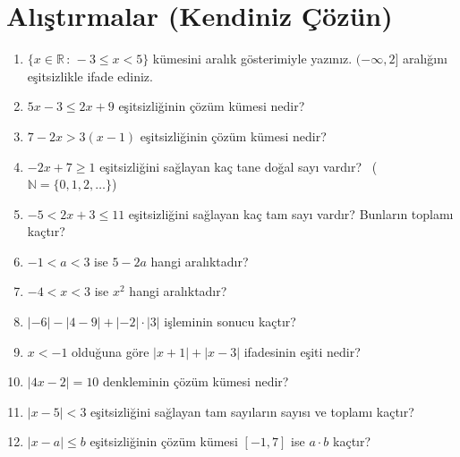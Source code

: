 \kendinizoncesi
\section{Alıştırmalar (Kendiniz Çözün)}

\begin{enumerate}[label=\textbf{\arabic*.},leftmargin=*,itemsep=4pt]
\item \(\{x\in\mathbb{R}\,:\,-3\le x<5\}\) kümesini aralık gösterimiyle yazınız. \((-\infty,2]\) aralığını eşitsizlikle ifade ediniz.
\item \(5x-3\le 2x+9\) eşitsizliğinin çözüm kümesi nedir?
\item \(7-2x>3(x-1)\) eşitsizliğinin çözüm kümesi nedir?
\item \(-2x+7\ge 1\) eşitsizliğini sağlayan kaç tane doğal sayı vardır? \ (\(\mathbb{N}=\{0,1,2,\dots\}\))
\item \(-5<2x+3\le 11\) eşitsizliğini sağlayan kaç tam sayı vardır? Bunların toplamı kaçtır?
\item \(-1<a<3\) ise \(5-2a\) hangi aralıktadır?
\item \(-4<x<3\) ise \(x^2\) hangi aralıktadır?
\item \(|-6|-|4-9|+|-2|\cdot|3|\) işleminin sonucu kaçtır?
\item \(x<-1\) olduğuna göre \(|x+1|+|x-3|\) ifadesinin eşiti nedir?
\item \(|4x-2|=10\) denkleminin çözüm kümesi nedir?
\item \(|x-5|<3\) eşitsizliğini sağlayan tam sayıların sayısı ve toplamı kaçtır?
\item \(|x-a|\le b\) eşitsizliğinin çözüm kümesi \([-1,7]\) ise \(a\cdot b\) kaçtır?
\end{enumerate}

